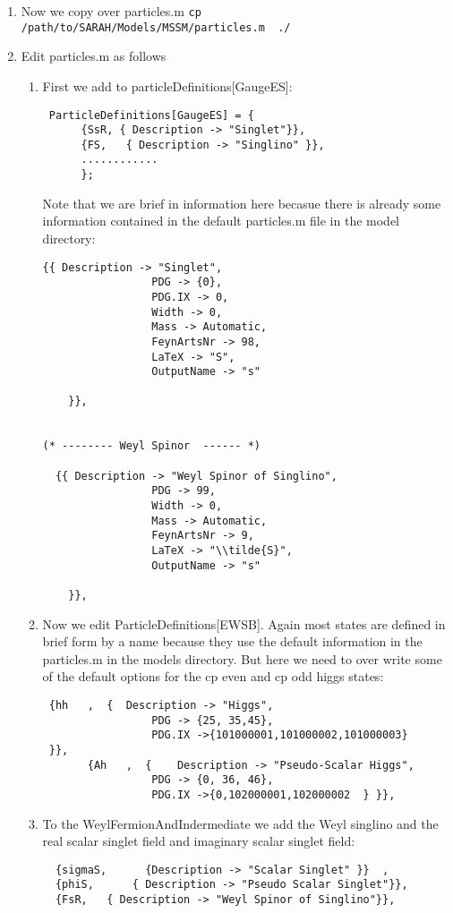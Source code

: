 \documentclass[final,3p,times,pdflatex]{elsarticle}
\newcommand{\code}[1]{\lstinline|#1|}  %
\begin{document}
\begin{enumerate}
\begin{enumerate}
\begin{lstlisting}
\end{lstlisting}
\end{enumerate}
\item Now we copy over particles.m \code{cp /path/to/SARAH/Models/MSSM/particles.m  ./}
\item Edit particles.m as follows
\begin{enumerate}  
\item First we add to particleDefinitions[GaugeES]:
\begin{lstlisting}
 ParticleDefinitions[GaugeES] = {
      {SsR, { Description -> "Singlet"}},        
      {FS,   { Description -> "Singlino" }},    
      ............
      };
\end{lstlisting}
Note that we are brief in information here becasue there is already some information contained in the default particles.m file in the model directory:
\begin{lstlisting} 
{{ Description -> "Singlet", 
                 PDG -> {0},
                 PDG.IX -> 0,
                 Width -> 0, 
                 Mass -> Automatic,
                 FeynArtsNr -> 98,
                 LaTeX -> "S",
                 OutputName -> "s"

    }},    
   
   
(* -------- Weyl Spinor  ------ *)   
    
  {{ Description -> "Weyl Spinor of Singlino", 
                 PDG -> 99,
                 Width -> 0, 
                 Mass -> Automatic,
                 FeynArtsNr -> 9,
                 LaTeX -> "\\tilde{S}",
                 OutputName -> "s"

    }},  

\end{lstlisting}
 \item Now we edit ParticleDefinitions[EWSB].  Again most states are defined in brief form by a name because they use the default information in the particles.m in the models directory.  But here we need to over write some of the default options for the cp even and cp odd higgs states: 
\begin{lstlisting}
 {hh   ,  {  Description -> "Higgs", 
                 PDG -> {25, 35,45},
                 PDG.IX ->{101000001,101000002,101000003}
 }}, 
       {Ah   ,  {    Description -> "Pseudo-Scalar Higgs",
                 PDG -> {0, 36, 46},
                 PDG.IX ->{0,102000001,102000002  } }}, 

\end{lstlisting}
\item To the WeylFermionAndIndermediate we add the Weyl singlino and the real scalar singlet field and imaginary scalar singlet field:  
 \begin{lstlisting}
  {sigmaS,      {Description -> "Scalar Singlet" }}  ,
  {phiS,      { Description -> "Pseudo Scalar Singlet"}},
  {FsR,   { Description -> "Weyl Spinor of Singlino"}},
 \end{lstlisting}
 

\end{enumerate}
\end{enumerate}
\end{document}
